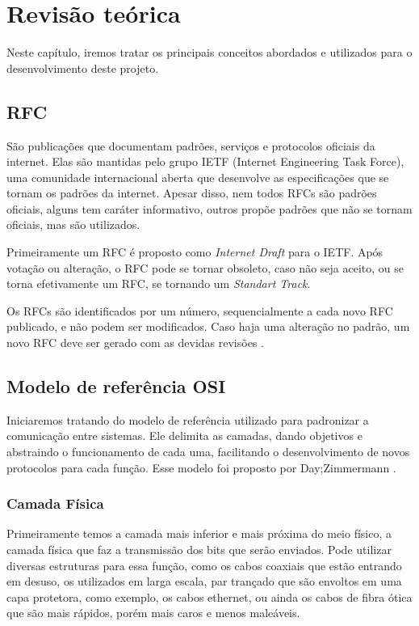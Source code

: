 \chapter{Revis{\~a}o te{\'o}rica}
\label{chap:Revisao Teorica}
	
Neste capítulo, iremos tratar os principais conceitos abordados e utilizados para o desenvolvimento deste projeto.

\section{RFC}

São publicações que documentam padrões, serviços e protocolos oficiais da internet. Elas são mantidas pelo grupo IETF (Internet Engineering Task Force), uma comunidade internacional aberta que desenvolve as especificações que se tornam os padrões da internet. Apesar disso, nem todos RFCs são padrões oficiais, alguns tem caráter informativo, outros propõe padrões que não se tornam oficiais, mas são utilizados.

Primeiramente um RFC é proposto como \textit{Internet Draft} para o IETF. Após votação ou alteração, o RFC pode se tornar obsoleto, caso não seja aceito, ou se torna efetivamente um RFC, se tornando um \textit{Standart Track}.

Os RFCs são identificados por um número, sequencialmente a cada novo RFC publicado, e não podem ser modificados. Caso haja uma alteração no padrão, um novo RFC deve ser gerado com as devidas revisões \cite{rfclocaweb}.


\section{Modelo de referência OSI}

Iniciaremos tratando do modelo de referência utilizado para padronizar a comunicação entre sistemas. Ele delimita as camadas, dando objetivos e abstraindo o funcionamento de cada uma, facilitando o desenvolvimento de novos protocolos para cada função. Esse modelo foi proposto por Day;Zimmermann \cite{tanenbaumredes}.

\subsection{Camada Física}

Primeiramente temos a camada mais inferior e mais próxima do meio físico, a camada física que faz a transmissão dos bits que serão enviados. Pode utilizar diversas estruturas para essa função, como os cabos coaxiais que estão entrando em desuso, os utilizados em larga escala, par trançado que são envoltos em uma capa protetora, como exemplo, os cabos ethernet, ou ainda os cabos de fibra ótica que são mais rápidos, porém mais caros e menos maleáveis.

